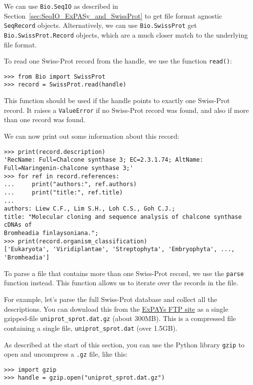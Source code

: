 \documentclass{report}
\begin{document}
We can use \verb+Bio.SeqIO+ as described in Section~\ref{sec:SeqIO_ExPASy_and_SwissProt} to get file format agnostic \verb|SeqRecord| objects.  Alternatively, we can use \verb+Bio.SwissProt+ get \verb|Bio.SwissProt.Record| objects, which are a much closer match to the underlying file format.

To read one Swiss-Prot record from the handle, we use the function \verb|read()|:
\begin{verbatim}
>>> from Bio import SwissProt
>>> record = SwissProt.read(handle)
\end{verbatim}
This function should be used if the handle points to exactly one Swiss-Prot record. It raises a \verb|ValueError| if no Swiss-Prot record was found, and also if more than one record was found.

We can now print out some information about this record:
\begin{verbatim}
>>> print(record.description)
'RecName: Full=Chalcone synthase 3; EC=2.3.1.74; AltName: Full=Naringenin-chalcone synthase 3;'
>>> for ref in record.references:
...     print("authors:", ref.authors)
...     print("title:", ref.title)
... 
authors: Liew C.F., Lim S.H., Loh C.S., Goh C.J.;
title: "Molecular cloning and sequence analysis of chalcone synthase cDNAs of
Bromheadia finlaysoniana.";
>>> print(record.organism_classification)
['Eukaryota', 'Viridiplantae', 'Streptophyta', 'Embryophyta', ..., 'Bromheadia']
\end{verbatim}

To parse a file that contains more than one Swiss-Prot record, we use the \verb|parse| function instead. This function allows us to iterate over the records in the file.

For example, let's parse the full Swiss-Prot database and collect all the descriptions.
You can download this from the \href{ftp://ftp.expasy.org/databases/uniprot/current_release/knowledgebase/complete/uniprot_sprot.dat.gz}{ExPAYs FTP site} as a single gzipped-file \verb|uniprot_sprot.dat.gz| (about 300MB).  This is a compressed file containing a single file, \verb|uniprot_sprot.dat| (over 1.5GB).

As described at the start of this section, you can use the Python library \verb|gzip| to open and uncompress a \texttt{.gz} file, like this:

\begin{verbatim}
>>> import gzip
>>> handle = gzip.open("uniprot_sprot.dat.gz")
\end{verbatim}
\end{document}
